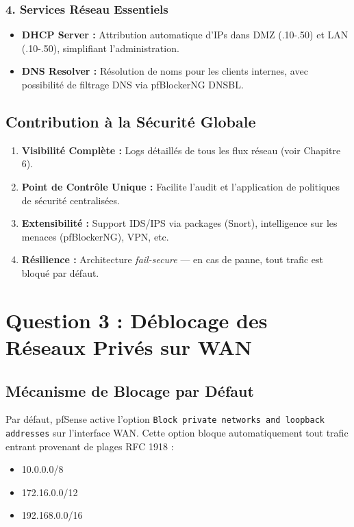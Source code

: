 \documentclass[12pt,a4paper,openany]{report}
\begin{document}
	\subsubsection{4. Services Réseau Essentiels}
	\begin{itemize}
		\item \textbf{DHCP Server :} Attribution automatique d'IPs dans DMZ (.10-.50) et LAN (.10-.50), simplifiant l'administration.
		\item \textbf{DNS Resolver :} Résolution de noms pour les clients internes, avec possibilité de filtrage DNS via pfBlockerNG DNSBL.
	\end{itemize}
	
	\subsection{Contribution à la Sécurité Globale}
	\begin{enumerate}
		\item \textbf{Visibilité Complète :} Logs détaillés de tous les flux réseau (voir Chapitre 6).
		\item \textbf{Point de Contrôle Unique :} Facilite l'audit et l'application de politiques de sécurité centralisées.
		\item \textbf{Extensibilité :} Support IDS/IPS via packages (Snort), intelligence sur les menaces (pfBlockerNG), VPN, etc.
		\item \textbf{Résilience :} Architecture \textit{fail-secure} --- en cas de panne, tout trafic est bloqué par défaut.
	\end{enumerate}
	
	\section{Question 3 : Déblocage des Réseaux Privés sur WAN}
	
	\subsection{Mécanisme de Blocage par Défaut}
	Par défaut, pfSense active l'option \texttt{Block private networks and loopback addresses} sur l'interface WAN. Cette option bloque automatiquement tout trafic entrant provenant de plages RFC 1918 :
	\begin{itemize}
		\item 10.0.0.0/8
		\item 172.16.0.0/12
		\item 192.168.0.0/16
	\end{itemize}
	
\end{document}
